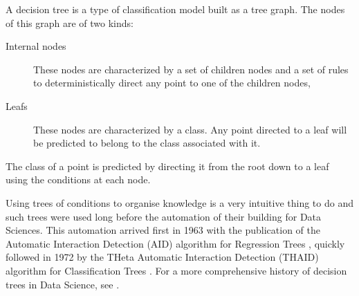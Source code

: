 \begin{definition}
    A decision tree is a type of classification model built as a tree graph. The nodes of this graph are of two kinds:
    \begin{description}
        \item[Internal nodes] These nodes are characterized by a set of children nodes and a set of rules to deterministically direct any point to one of the children nodes,
        \item[Leafs] These nodes are characterized by a class. Any point directed to a leaf will be predicted to belong to the class associated with it.
    \end{description}
    The class of a point is predicted by directing it from the root down to a leaf using the conditions at each node.
\end{definition}




Using trees of conditions to organise knowledge is a very intuitive thing to do and such trees were used long before the automation of their building for Data Sciences. This automation arrived first in 1963 with the publication of the Automatic Interaction Detection (AID) algorithm for Regression Trees \cite{morgan1963_first_reg_tree}, quickly followed in 1972 by the THeta Automatic Interaction Detection (THAID) algorithm for Classification Trees \cite{Messenger1972_first_classification_tree}. For a more comprehensive history of decision trees in Data Science, see \cite{Loh2014_decision_trees_history}.


